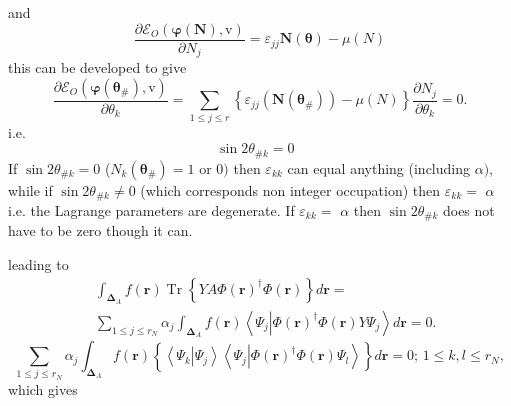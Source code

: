 \documentclass[aps,preprint]{revtex4}%
\begin{document}
and
\begin{equation}
\frac{\partial\mathcal{E}_{O}\left(  \boldsymbol{\varphi}\left(
\boldsymbol{N}\right)  \boldsymbol{,}\mathrm{v}\right)  }{\partial N_{j}%
}=\varepsilon_{jj}\boldsymbol{N}\left(  \boldsymbol{\theta}\right)
-\mu\left(  N\right)
\end{equation}
this can be developed to give
\begin{equation}
\frac{\partial\mathcal{E}_{O}\left(  \boldsymbol{\varphi}\left(
\boldsymbol{\theta}_{\#}\right)  \boldsymbol{,}\mathrm{v}\right)  }%
{\partial\theta_{k}}=\sum\limits_{1\leq j\leq r}\left\{  \varepsilon
_{jj}\left(  \boldsymbol{N}\left(  \boldsymbol{\theta}_{\#}\right)  \right)
-\mu\left(  N\right)  \right\}  \frac{\partial N_{j}}{\partial\theta_{k}}=0.
\label{theta}%
\end{equation}
i.e.
\begin{equation}
\sin2\theta_{\#k}=0\text{ } \label{Con1}%
\end{equation}
If $\sin2\theta_{\#k}=0$ ($N_{k}\left(  \boldsymbol{\theta}_{\#}\right)  =1$
or $0)$ then $\varepsilon_{kk}$ can equal anything (including $\alpha)$, while
if $\sin2\theta_{\#k}\neq0$ (which corresponds non integer occupation) then
$\varepsilon_{kk}=$ $\alpha$ i.e. the Lagrange parameters are degenerate. If
$\varepsilon_{kk}=$ $\alpha$ then $\sin2\theta_{\#k}$ does not have to be zero
though it can.

\bigskip

leading to
\begin{align}
&  \int_{\boldsymbol{\Delta}_{A}}f\left(  \boldsymbol{r}\right)
\operatorname{Tr}\left\{  YA\Phi\left(  \boldsymbol{r}\right)  ^{\dagger}%
\Phi\left(  \boldsymbol{r}\right)  \right\}  d\boldsymbol{r}=\nonumber\\
&  \sum_{1\leq j\leq r_{N}}\alpha_{j}\int_{\boldsymbol{\Delta}_{A}}f\left(
\boldsymbol{r}\right)  \left\langle \Psi_{j}\left\vert \Phi\left(
\boldsymbol{r}\right)  ^{\dagger}\Phi\left(  \boldsymbol{r}\right)  Y\Psi
_{j}\right.  \right\rangle d\boldsymbol{r}=0.
\end{align}%
\begin{equation}
\sum_{1\leq j\leq r_{N}}\alpha_{j}\int_{\boldsymbol{\Delta}_{A}}f\left(
\boldsymbol{r}\right)  \left\{  \left\langle \Psi_{k}\left\vert \Psi
_{j}\right.  \right\rangle \left\langle \Psi_{j}\left\vert \Phi\left(
\boldsymbol{r}\right)  ^{\dagger}\Phi\left(  \boldsymbol{r}\right)  \Psi
_{l}\right.  \right\rangle \right\}  d\boldsymbol{r}=0;\,1\leq k,l\leq
r_{N},\nonumber
\end{equation}
which gives
\end{document}
